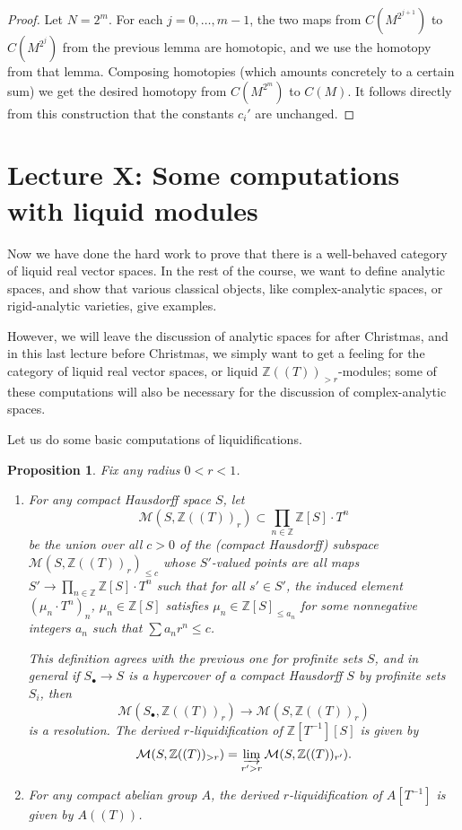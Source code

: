 \documentclass[11pt]{amsbook}
\numberwithin{equation}{section}
\numberwithin{theorem}{section}
\newtheorem{proposition}[theorem]{Proposition}
\theoremstyle{definition}
\begin{document}
\begin{proof} Let $N=2^m$. For each $j=0,\ldots,m-1$, the two maps from $C(M^{2^{j+1}})$ to $C(M^{2^j})$ from the previous lemma are homotopic, and we use the homotopy from that lemma. Composing homotopies (which amounts concretely to a certain sum) we get the desired homotopy from $C(M^{2^m})$ to $C(M)$. It follows directly from this construction that the constants $c_i'$ are unchanged.
\end{proof}

\newpage

\section{Lecture X: Some computations with liquid modules}

Now we have done the hard work to prove that there is a well-behaved category of liquid real vector spaces. In the rest of the course, we want to define analytic spaces, and show that various classical objects, like complex-analytic spaces, or rigid-analytic varieties, give examples.

However, we will leave the discussion of analytic spaces for after Christmas, and in this last lecture before Christmas, we simply want to get a feeling for the category of liquid real vector spaces, or liquid $\mathbb Z((T))_{>r}$-modules; some of these computations will also be necessary for the discussion of complex-analytic spaces.

Let us do some basic computations of liquidifications.

\begin{proposition}\label{prop:computeliquidification} Fix any radius $0<r<1$.
\begin{enumerate}
\item For any compact Hausdorff space $S$, let
\[
\mathcal M(S,\mathbb Z((T))_r)\subset \prod_{n\in \mathbb Z}\mathbb Z[S]\cdot T^n
\]
be the union over all $c>0$ of the (compact Hausdorff) subspace $\mathcal M(S,\mathbb Z((T))_r)_{\leq c}$ whose $S'$-valued points are all maps $S'\to \prod_{n\in \mathbb Z}\mathbb Z[S]\cdot T^n$ such that for all $s'\in S'$, the induced element $(\mu_n\cdot T^n)_n$, $\mu_n\in \mathbb Z[S]$ satisfies $\mu_n\in \mathbb Z[S]_{\leq a_n}$ for some nonnegative integers $a_n$ such that $\sum a_n r^n\leq c$.

This definition agrees with the previous one for profinite sets $S$, and in general if $S_\bullet\to S$ is a hypercover of a compact Hausdorff $S$ by profinite sets $S_i$, then
\[
\mathcal M(S_\bullet,\mathbb Z((T))_r)\to \mathcal M(S,\mathbb Z((T))_r)
\]
is a resolution. The derived $r$-liquidification of $\mathbb Z[T^{-1}][S]$ is given by
\[
\mathcal M(S,\mathbb Z((T))_{>r}) = \varinjlim_{r'>r} \mathcal M(S,\mathbb Z((T))_{r'}).
\]
\item For any compact abelian group $A$, the derived $r$-liquidification of $A[T^{-1}]$ is given by $A((T))$.
\end{enumerate}
\end{proposition}
\end{document}
